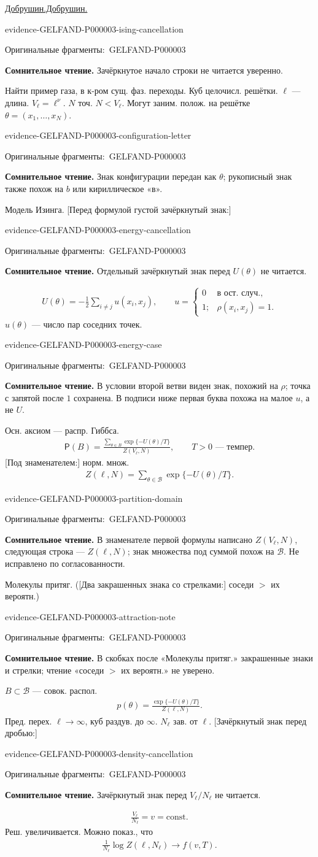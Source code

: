 \documentclass[11pt]{article}
\let\MathUnderline\underline
\renewcommand{\underline}[1]{\ifmmode\MathUnderline{#1}\else\uline{#1}\fi}
\newcommand{\EvidenceBlock}[4]{%
 \par\smallskip\noindent\begin{minipage}{\linewidth}
 \begin{minipage}[t]{.47\linewidth}\vspace{0pt}\centering
 \csname evidence-#1-#2\endcsname\par
 {\scriptsize\SourceCropCaption\ #1}\par
 \end{minipage}\hfill
 \begin{minipage}[t]{.49\linewidth}\vspace{0pt}\raggedright
 {\small\color{orange!65!black}\textbf{#4} #3}\par
 \end{minipage}
 \end{minipage}\par\smallskip}
\newcommand{\Unclear}[3]{\EvidenceBlock{#1}{#2}{#3}{\ReadingCaption}}
\newcommand{\SourceCropCaption}{Оригинальные фрагменты:}\newcommand{\ReadingCaption}{Сомнительное чтение.}\newcommand{\IncompleteCaption}{Неразобранный фрагмент.}\newcommand{\DiagramCaption}{Рисунок и набранное описание.}
\begin{document}
\underline{Добрушин.}
[Зачёркнуто перед «Найти»:] \Unclear{GELFAND-P000003}{ising-cancellation}{Зачёркнутое начало строки не читается уверенно.}
Найти пример газа, в к-ром сущ. фаз. переходы.
Куб целочисл. решётки.
$\ell$ — длина. $V_\ell=\ell^\nu$.
$N$ точ. $N<V_\ell$.
Могут заним. полож. на решётке
$\theta=(x_1,\ldots,x_N)$.
\Unclear{GELFAND-P000003}{configuration-letter}{Знак конфигурации передан как $\theta$; рукописный знак также похож на $b$ или кириллическое «в».}

Модель Изинга.
[Перед формулой густой зачёркнутый знак:]
\Unclear{GELFAND-P000003}{energy-cancellation}{Отдельный зачёркнутый знак перед $U(\theta)$ не читается.}
\begin{gather*}
 U(\theta)=-\frac12\sum_{i\ne j}u(x_i,x_j),\qquad
 u=\begin{cases}
 0&\text{в ост. случ.},\\
 1;&\rho(x_i,x_j)=1.
 \end{cases}
\end{gather*}
$u(\theta)$ — число пар соседних точек.
\Unclear{GELFAND-P000003}{energy-case}{В условии второй ветви виден знак, похожий на $\rho$; точка с запятой после $1$ сохранена. В подписи ниже первая буква похожа на малое $u$, а не $U$.}

Осн. аксиом — распр. Гиббса.
\begin{gather*}
 \mathsf{P}(B)=
 \frac{\displaystyle\sum_{\theta\in B}\exp\{-U(\theta)/T\}}
 {Z(V_\ell,N)},\qquad T>0\text{ — темпер.}
\end{gather*}
[Под знаменателем:] норм. множ.
\begin{gather*}
 Z(\ell,N)=\sum_{\theta\in\mathcal{B}}\exp\{-U(\theta)/T\}.
\end{gather*}
\Unclear{GELFAND-P000003}{partition-domain}{В знаменателе первой формулы написано $Z(V_\ell,N)$, следующая строка — $Z(\ell,N)$; знак множества под суммой похож на $\mathcal{B}$. Не исправлено по согласованности.}

Молекулы притяг.
([Два закрашенных знака со стрелками:] соседи $>$ их вероятн.)
\Unclear{GELFAND-P000003}{attraction-note}{В скобках после «Молекулы притяг.» закрашенные знаки и стрелки; чтение «соседи $>$ их вероятн.» не уверено.}
$B\subset\mathcal{B}$ — совок. распол.
\begin{gather*}
 p(\theta)=\frac{\exp\{-U(\theta)/T\}}{Z(\ell,N)}.
\end{gather*}
Пред. перех. $\ell\to\infty$, куб раздув. до $\infty$.
$N_\ell$ зав. от $\ell$.
[Зачёркнутый знак перед дробью:]
\Unclear{GELFAND-P000003}{density-cancellation}{Зачёркнутый знак перед $V_\ell/N_\ell$ не читается.}
\begin{gather*}
 \frac{V_\ell}{N_\ell}=v=\mathrm{const}.
\end{gather*}
Реш. увеличивается.
Можно показ., что
\begin{gather*}
 \frac1{N_\ell}\log Z(\ell,N_\ell)\longrightarrow f(v,T).
\end{gather*}
\end{document}
